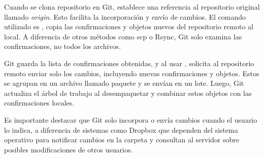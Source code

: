 
Cuando se clona repositorio en Git, establece una referencia al repositorio original llamado
\textit{origin}. Esto facilita la incorporación y envío de cambios. El comando utilizado es
, copia las confirmaciones y objetos nuevos del repositorio remoto al local.
A diferencia de otros métodos como scp o Rsync, Git solo examina las confirmaciones, no todos
los archivos.

Git guarda la lista de confirmaciones obtenidas, y al usar , solicita
al repositorio remoto enviar solo los cambios, incluyendo nuevas confirmaciones y objetos.
Estos se agrupan en un archivo llamado paquete y se envían en un lote. Luego, Git actualiza
el árbol de trabajo al desempaquetar y combinar estos objetos con las confirmaciones locales.

Es importante destacar que Git solo incorpora o envía cambios cuando el usuario lo indica, a
diferencia de sistemas como Dropbox que dependen del sistema operativo para notificar cambios
en la carpeta y consultan al servidor sobre posibles modificaciones de otros usuarios.

